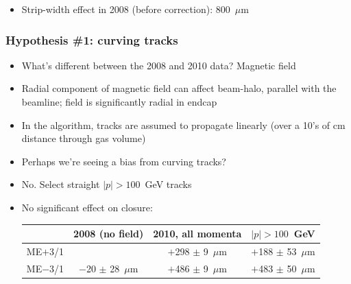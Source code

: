 \documentclass[compress]{beamer}
\begin{document}
\begin{frame}
\begin{itemize}
\item Strip-width effect in 2008 (before correction): 800~$\mu$m
\end{itemize}
\end{frame}

\begin{frame}
\frametitle{Hypothesis \#1: curving tracks}

\begin{itemize}
\item What's different between the 2008 and 2010 data?  Magnetic field

\item Radial component of magnetic field can affect beam-halo, parallel with the beamline; field is significantly radial in endcap

\item In the algorithm, tracks are assumed to propagate linearly (over
  a 10's of cm distance through gas volume)

\item Perhaps we're seeing a bias from curving tracks?
\end{itemize}

\vfill
\begin{itemize}
\item No.  Select straight $|p| > 100$~GeV tracks

\item No significant effect on closure:

\vfill
\begin{tabular}{c c c c}
\hline\hline
& 2008 (no field) & 2010, all momenta & $|p| > 100$~GeV \\\hline
ME$+$3/1 &                       & $+$298 $\pm$ 9~$\mu$m & $+$188 $\pm$ 53~$\mu$m \\
ME$-$3/1 & $-$20 $\pm$ 28~$\mu$m & $+$486 $\pm$ 9~$\mu$m & $+$483 $\pm$ 50~$\mu$m \\\hline\hline
\end{tabular}
\end{itemize}
\end{frame}
\end{document}
